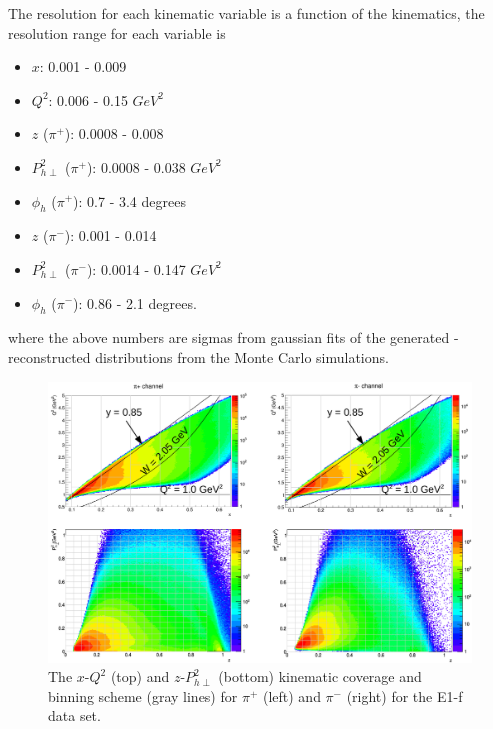 The resolution for each kinematic variable is a function of the kinematics, the resolution range for each variable is
\begin{itemize}
\item $x$: 0.001 - 0.009
\item $Q^2$: 0.006 - 0.15 $GeV^2$
\item $z$ ($\pi^+$): 0.0008 - 0.008
\item $P_{h\perp}^2$ ($\pi^+$): 0.0008 - 0.038 $GeV^2$
\item $\phi_h$ ($\pi^+$):  0.7 - 3.4 degrees
\item $z$ ($\pi^-$): 0.001 - 0.014
\item $P_{h\perp}^2$ ($\pi^-$): 0.0014 - 0.147 $GeV^2$
\item $\phi_h$ ($\pi^-$):  0.86 - 2.1 degrees.
\end{itemize}
where the above numbers are sigmas from gaussian fits of the generated - reconstructed distributions from the Monte Carlo simulations.
%
\begin{figure}[htp]
\centering
\includegraphics[width=4.5in]{figures/binningScheme.png}
\caption{The $x$-$Q^2$ (top) and $z$-$P_{h\perp}^2$ (bottom) kinematic coverage and binning scheme (gray lines) for $\pi^+$ (left) and $\pi^-$ (right) for the E1-f data set.}
\label{fig:binningScheme}
\end{figure}


